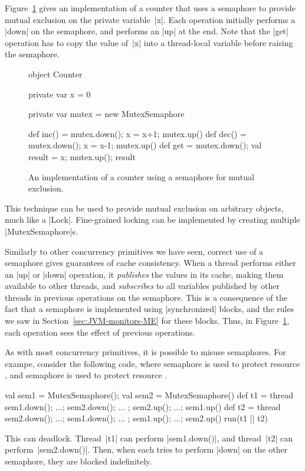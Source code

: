 Figure~\ref{fig:semaphore-counter} gives an implementation of a counter that
uses a semaphore to provide mutual exclusion on the private variable~|x|.
Each operation initially performs a |down| on the semaphore, and performs an
|up| at the end.  Note that the |get| operation has to copy the value of~|x|
into a thread-local variable before raising the semaphore.


\begin{figure}
\begin{scala}
object Counter{
  private var x = 0
  
  private var mutex = new MutexSemaphore
    
  def inc() = { mutex.down(); x = x+1; mutex.up() }
  def dec() = { mutex.down(); x = x-1; mutex.up() }
  def get = { mutex.down(); val result = x; mutex.up(); result }
}
\end{scala}
\caption{An implementation of a counter using a semaphore for mutual
  exclusion.}
\label{fig:semaphore-counter}
\end{figure}



This technique can be used to provide mutual exclusion on arbitrary objects,
much like a |Lock|.  Fine-grained locking can be implemented by creating
multiple |MutexSemaphore|s.

Similarly to other concurrency primitives we have seen, correct use of a
semaphore gives guarantees of cache consistency.
When a thread performs either an |up| or |down| operation,
it \emph{publishes} the values in its cache, making them
available to other threads, and \emph{subscribes} to all
variables published by other threads in previous operations on the semaphore.
This is a consequence of the fact that a semaphore is implemented using
|synchronized| blocks, and the rules we saw in
Section~\ref{sec:JVM-monitors-ME} for these blocks.  Thus, in
Figure~\ref{fig:semaphore-counter}, each operation sees the effect of previous
operations.

As with most concurrency primitives, it is possible to misuse semaphores.  For
exampe, consider the following code, where semaphore  is used to
protect resource , and semaphore  is used to protect
resource .
%
\begin{scala}
  val sem1 = MutexSemaphore(); val sem2 = MutexSemaphore()
  def t1 = thread{ sem1.down(); ...; sem2.down(); ... ; sem2.up(); ...; sem1.up() }
  def t2 = thread{ sem2.down(); ...; sem1.down(); ... ; sem1.up(); ...; sem2.up() }
  run(t1 || t2)
\end{scala}
%
This can deadlock.  Thread~|t1| can perform  |sem1.down()|, and thread~|t2| can
perform~|sem2.down()|.  Then, when each tries to perform |down| on the other
semaphore, they are blocked indefinitely. 

